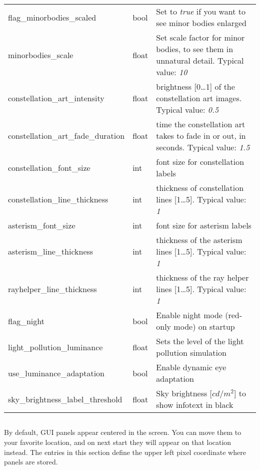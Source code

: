 \begin{longtable}{l|l|p{77mm}}
flag\_minorbodies\_scaled     & bool & Set to \emph{true} if you want to see minor bodies enlarged \\
minorbodies\_scale            & float & Set scale factor for minor bodies, to see them in unnatural detail. Typical value: \emph{10}\\
\midrule
constellation\_art\_intensity      & float & brightness [0\ldots1] of the constellation art images. Typical value: \emph{0.5}\\%
constellation\_art\_fade\_duration & float & time the constellation art takes to fade in or out, in seconds. Typical value: \emph{1.5}\\%
constellation\_font\_size          & int   & font size for constellation labels\\%
constellation\_line\_thickness     & int   & thickness of constellation lines [1\ldots5]. Typical value: \emph{1}\\%
asterism\_font\_size               & int   & font size for asterism labels\\%
asterism\_line\_thickness          & int   & thickness of the asterism lines [1\ldots5]. Typical value: \emph{1}\\%
rayhelper\_line\_thickness         & int   & thickness of the ray helper lines [1\ldots5]. Typical value: \emph{1}\\\midrule
flag\_night                        & bool  & Enable night mode (red-only mode) on startup\\\midrule
light\_pollution\_luminance        & float & Sets the level of the light pollution simulation\\\midrule %
use\_luminance\_adaptation         & bool  & Enable dynamic eye adaptation\\\midrule %
sky\_brightness\_label\_threshold  & float & Sky brightness [$cd/m^2$] to show infotext in black \\ %
\bottomrule
\end{longtable}



\subsection{}

By default, GUI panels appear centered in the screen. You can move them to your favorite location, 
and on next start they will appear on that location instead.
The entries in this section define the upper left pixel coordinate where panels are stored.

